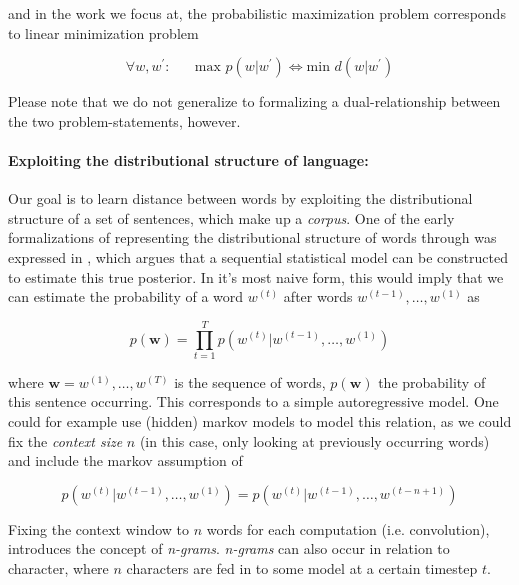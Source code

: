 \documentclass[a4paper,12pt,twoside,openright]{report}
\begin{document}
and in the work we focus at, the probabilistic maximization problem corresponds to linear minimization problem

\begin{equation}
\forall w, w^{\prime} : \hspace{20pt} \text{max } p \left(w | w^{\prime}\right) \iff \text{min } d(w | w^{\prime})
\end{equation}

Please note that we do not generalize to formalizing a dual-relationship between the two problem-statements, however.

\paragraph{Exploiting the distributional structure of language:} Our goal is to learn distance between words by exploiting the distributional structure of a set of sentences, which make up a \textit{corpus}. 
One of the early formalizations of representing the distributional structure of words through was expressed in \cite{bengio03}, which argues that a sequential statistical model can be constructed to estimate this true posterior.  
In it's most naive form, this would imply that we can estimate the probability of a word $w^{(t)}$ after words $w^{(t-1)}, \ldots, w^{(1)}$ as

\begin{equation}
p(\mathbf{w}) = \prod_{t=1}^T p\left( w^{(t)} | w^{(t -1)}, \ldots, w^{(1)} \right)
\end{equation}{\label{eq:naive_sequential_probability}}


where $\mathbf{w} = w^{(1)}, \dots, w^{(T)} $ is the sequence of words, $p(\mathbf{w})$ the probability of this sentence occurring.
This corresponds to a simple autoregressive model.
One could for example use (hidden) markov models to model this relation, as we could fix the \textit{context size} $n$ (in this case, only looking at previously occurring words) and include the markov assumption of

\begin{equation}
p\left( w^{(t)} | w^{(t -1)}, \ldots, w^{(1)} \right) = p\left( w^{(t)} | w^{(t -1)}, \ldots, w^{(t - n + 1)} \right)
\end{equation}{\label{eq:naive_sequential_probability_markovian}}

Fixing the context window to $n$ words for each computation (i.e. convolution), introduces the concept of \textit{n-grams}. 
\textit{n-grams} can also occur in relation to character, where $n$ characters are fed in to some model at a certain timestep $t$.
\end{document}
